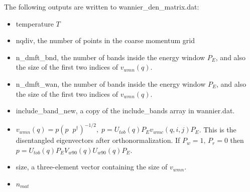 \documentclass[aps,prb,singlecolumn,preprintnumbers,amsmath,amssymb]{revtex4}
\begin{document}

The following outputs are written to wannier\_den\_matrix.dat:
\begin{itemize}
\item temperature $T$
\item nqdiv, the number of points  in the coarse momentum grid %
\item n\_dmft\_bnd, the number of bands inside the energy window $P_E$, and also the size of the first two indices of $v_{wmn}(q)$. %
\item      n\_dmft\_wan, the number of bands inside the energy window $P_E$, and also the size of the first two indices of $v_{wmn}(q)$.  %
\item include\_band\_new, a copy of the include\_bands array in wannier.dat.
\item  $v_{wmn}(q) =  p (p  \;\; p^\dagger)^{-1/2}, \; p = U_{tob}(q) P_E  v_{wmc}(q,i,j) P_E$.  This is the disentangled eigenvectors after orthonormalization. If $P_w=1,\,P_r=0$ then $ p = U_{tob}(q) P_E V_{w90}(q)  U_{w90}(q) P_E$. %
\item size, a three-element vector containing the size of $v_{wmn} $.
\item $n_{mat}$
\end{itemize}
\end{document}
